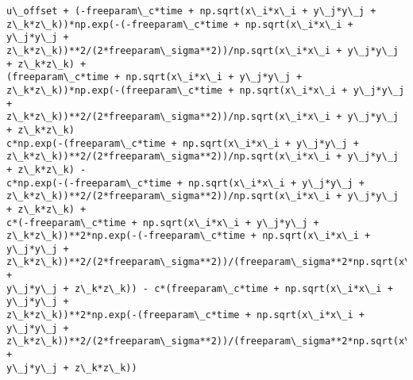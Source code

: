 \documentclass[landscape,letterpaper,10pt,english]{article}
\begin{document}
    \begin{Verbatim}[commandchars=\\\{\}]
u\_offset + (-freeparam\_c*time + np.sqrt(x\_i*x\_i + y\_j*y\_j +
z\_k*z\_k))*np.exp(-(-freeparam\_c*time + np.sqrt(x\_i*x\_i + y\_j*y\_j +
z\_k*z\_k))**2/(2*freeparam\_sigma**2))/np.sqrt(x\_i*x\_i + y\_j*y\_j + z\_k*z\_k) +
(freeparam\_c*time + np.sqrt(x\_i*x\_i + y\_j*y\_j +
z\_k*z\_k))*np.exp(-(freeparam\_c*time + np.sqrt(x\_i*x\_i + y\_j*y\_j +
z\_k*z\_k))**2/(2*freeparam\_sigma**2))/np.sqrt(x\_i*x\_i + y\_j*y\_j + z\_k*z\_k)
c*np.exp(-(freeparam\_c*time + np.sqrt(x\_i*x\_i + y\_j*y\_j +
z\_k*z\_k))**2/(2*freeparam\_sigma**2))/np.sqrt(x\_i*x\_i + y\_j*y\_j + z\_k*z\_k) -
c*np.exp(-(-freeparam\_c*time + np.sqrt(x\_i*x\_i + y\_j*y\_j +
z\_k*z\_k))**2/(2*freeparam\_sigma**2))/np.sqrt(x\_i*x\_i + y\_j*y\_j + z\_k*z\_k) +
c*(-freeparam\_c*time + np.sqrt(x\_i*x\_i + y\_j*y\_j +
z\_k*z\_k))**2*np.exp(-(-freeparam\_c*time + np.sqrt(x\_i*x\_i + y\_j*y\_j +
z\_k*z\_k))**2/(2*freeparam\_sigma**2))/(freeparam\_sigma**2*np.sqrt(x\_i*x\_i +
y\_j*y\_j + z\_k*z\_k)) - c*(freeparam\_c*time + np.sqrt(x\_i*x\_i + y\_j*y\_j +
z\_k*z\_k))**2*np.exp(-(freeparam\_c*time + np.sqrt(x\_i*x\_i + y\_j*y\_j +
z\_k*z\_k))**2/(2*freeparam\_sigma**2))/(freeparam\_sigma**2*np.sqrt(x\_i*x\_i +
y\_j*y\_j + z\_k*z\_k))
    \end{Verbatim}
\end{document}
